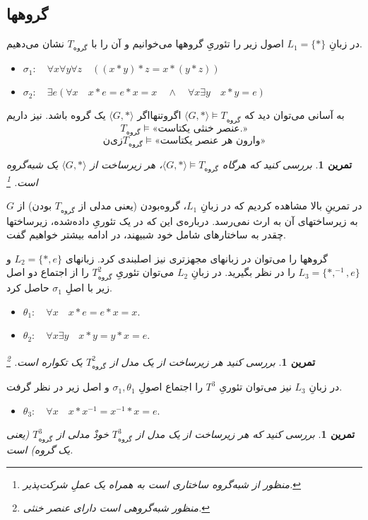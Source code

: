 \documentclass[12pt,a4paper]{article}
\theoremstyle{colorhead}
\newtheorem{tam}[thm]{تمرین}
\begin{document}
\subsection{گروهها }
در زبانِ
$L_1=\{*\}$
اصول زیر را تئوری‌ِ‌ گروهها می‌خوانیم و آن را با
$T_{\text{گروه}}$
نشان می‌دهیم.
\begin{itemize}
\item 
$\sigma_1: \quad \forall x\forall y\forall z \quad \left((x*y)*z=x*(y*z)\right)$
\item $\sigma_2: \quad \exists e \left( \forall x\quad  x*e=e*x=x\quad \wedge\quad  \forall x
 \exists y \quad x*y=e\right)$
\end{itemize}
به آسانی می‌توان دید که
$\langle G,*\rangle \models T_{\text{گروه}}$
اگروتنهااگر
$\langle G,*\rangle$
یک گروه باشد. نیز داریم
\[
T_{\text{گروه}}\models \text{«عنصر خنثی یکتاست.»}
\]
\[
نیز
T_{\text{گروه}}\models \text{«وارون هر عنصر یکتاست»}
\]
\begin{tam}
بررسی کنید که هرگاه
$\langle G,*\rangle \models T_{\text{گروه}}$،
هر زیرساخت از
$\langle G,*\rangle$
یک شبه‌گروه
است.
\footnote{منظور از شبه‌گروه ساختاری است به همراه یک عملِ شرکت‌پذیر.}
\end{tam}
در تمرینِ بالا مشاهده کردیم که در زبانِ
$L_1$،
گروه‌بودن (یعنی مدلی از
$T_{\text{گروه}}$
بودن)
از
$G$
به زیرساختهای آن به ارث نمی‌رسد. درباره‌ی این که در یک تئوریِ داده‌شده،‌ 
زیرساختها چقدر به ساختارهای شامل خود شبیهند، در ادامه بیشتر خواهیم گفت.
\par 
گروهها را می‌توان در زبانهای مجهزتری نیز اصلبندی کرد. زبانهای
$L_2=\{*,e\}$
و
\mbox{$L_3=\{*,^{-1},e\}$}
را در نظر بگیرید. در زبانِ
$L_2$
می‌توان تئوریِ
$T^2_{\text{گروه}}$
را از اجتماع دو اصل زیر با اصلِ
$\sigma_1$
حاصل کرد.
\begin{itemize}
\item 
$\theta_1:\quad \forall x \quad x*e=e*x=x$.
\item 
$\theta_2:\quad \forall x\exists y\quad x*y=y*x=e$.
\end{itemize}
\begin{tam}
بررسی کنید هر زیرساخت از یک مدل از
$T^2_{\text{گروه}}$
یک تکواره
است.
\footnote{منظور شبه‌گروهی است دارای عنصر خنثی.}
\end{tam}
در زبانِ
$L_3$
نیز می‌توان تئوریِ
$T^3_{\text{}}$
را اجتماع اصولِ
$\sigma_1,\theta_1$
و
اصل زیر در نظر گرفت.
\begin{itemize}
\item $\theta_3:\quad \forall x\quad x*x^{-1}=x^{-1}*x=e$.
\end{itemize}
\begin{tam}
بررسی کنید که هر زیرساخت از یک مدل از 
$T^3_{\text{گروه}}$
خودْ مدلی از
$T^3_{\text{گروه}}$
(یعنی یک گروه) است.
\end{tam}
\end{document}
